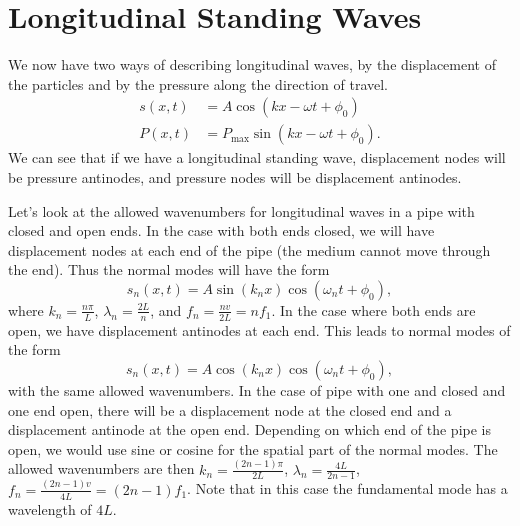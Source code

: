 \documentclass[../classical_mechanics.tex]{subfiles}
\begin{document}
    \section{Longitudinal Standing Waves}\label{sec:longitudinal-standing-waves}
        We now have two ways of describing longitudinal waves, by the displacement of the particles and by the pressure along the direction of travel.
        \begin{align}
            s(x,t)&=A\cos(kx-\omega t+\phi_0)\\
            P(x,t)&=P_\text{max}\sin(kx-\omega t+\phi_0).
        \end{align}
        We can see that if we have a longitudinal standing wave, displacement nodes will be pressure antinodes, and pressure nodes will be displacement antinodes.

        Let's look at the allowed wavenumbers for longitudinal waves in a pipe with closed and open ends.
        In the case with both ends closed, we will have displacement nodes at each end of the pipe (the medium cannot move through the end).
        Thus the normal modes will have the form
        \begin{equation}
            s_n(x,t)=A\sin(k_n x)\cos(\omega_n t+\phi_0),
        \end{equation}
        where $k_n=\frac{n\pi}{L}$, $\lambda_n=\frac{2L}{n}$, and $f_n=\frac{nv}{2L}=nf_1$.
        In the case where both ends are open, we have displacement antinodes at each end.
        This leads to normal modes of the form
        \begin{equation}
            s_n(x,t)=A\cos(k_n x)\cos(\omega_n t+\phi_0),
        \end{equation}
        with the same allowed wavenumbers.
        In the case of pipe with one and closed and one end open, there will be a displacement node at the closed end and a displacement antinode at the open end.
        Depending on which end of the pipe is open, we would use sine or cosine for the spatial part of the normal modes.
        The allowed wavenumbers are then $k_n=\frac{(2n-1)\pi}{2L}$, $\lambda_n=\frac{4L}{2n-1}$, $f_n=\frac{(2n-1)v}{4L}=(2n-1)f_1$.
        Note that in this case the fundamental mode has a wavelength of $4L$.
\end{document}
